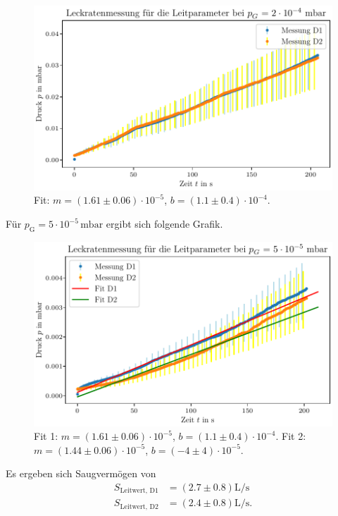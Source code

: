 \begin{figure}[H]
    \centering
    \includegraphics[width=\textwidth]{plots/Leitparam_2e4.pdf}
    \caption{Fit: $m = (\num{1.61} \pm \num{0.06}) \cdot 10^{-5}$, $b = (\num{1.1} \pm \num{0.4}) \cdot 10^{-4}$.}
    \label{fig:Leitparam_2e4}
\end{figure}

Für $p_\text{G} = 5 \cdot 10^{-5} \, \si{\milli\bar}$ ergibt sich folgende Grafik.

\begin{figure}[H]
    \centering
    \includegraphics[width=\textwidth]{plots/Leitparam_5e5.pdf}
    \caption{Fit 1: $m = (\num{1.61} \pm \num{0.06}) \cdot 10^{-5}$, $b = (\num{1.1} \pm \num{0.4}) \cdot 10^{-4}$. Fit 2: $m = (\num{1.44} \pm \num{0.06}) \cdot 10^{-5}$, $b = (\num{-4} \pm \num{4}) \cdot 10^{-5}$.}
    \label{fig:Leitparam_5e5}
\end{figure}

Es ergeben sich Saugvermögen von
\begin{align}
    S_{\text{Leitwert, D1}} &= (\num{2.7} \pm \num{0.8}) \si{\liter\per\second} \\
    S_{\text{Leitwert, D2}} &= (\num{2.4} \pm \num{0.8}) \si{\liter\per\second}.
\end{align}


